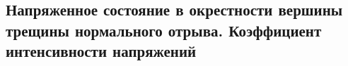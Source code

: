 

\subsection{Напряженное состояние в окрестности вершины трещины нормального отрыва. Коэффициент интенсивности напряжений}




